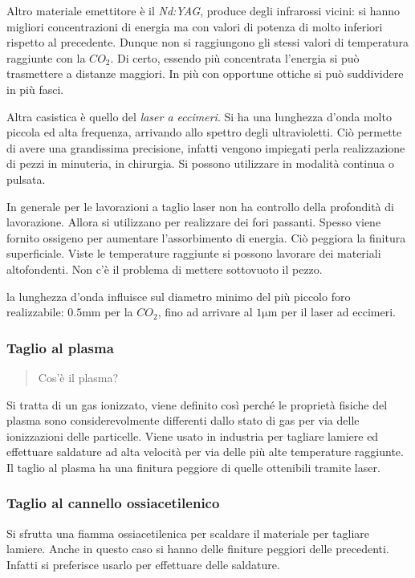 Altro materiale emettitore è il \emph{Nd:YAG}, produce degli infrarossi vicini: si hanno migliori concentrazioni di energia ma con valori di potenza di molto inferiori rispetto al precedente. Dunque non si raggiungono gli stessi valori di temperatura raggiunte con la $CO_2$.
Di certo, essendo più concentrata l'energia si può trasmettere a distanze maggiori. In più con opportune ottiche si può suddividere in più fasci.

Altra casistica è quello del \emph{laser a eccimeri}. Si ha una lunghezza d'onda molto piccola ed alta frequenza, arrivando allo spettro degli ultravioletti. 
Ciò permette di avere una grandissima precisione, infatti vengono impiegati perla realizzazione di pezzi in minuteria, in chirurgia.
Si possono utilizzare in modalità continua o pulsata.

In generale per le lavorazioni a taglio laser non ha controllo della profondità di lavorazione. Allora si utilizzano per realizzare dei fori passanti.
Spesso viene fornito ossigeno per aumentare l'assorbimento di energia.
Ciò peggiora la finitura superficiale. 
Viste le temperature raggiunte si possono lavorare dei materiali altofondenti. Non c'è il problema di mettere sottovuoto il pezzo.

la lunghezza d'onda influisce sul diametro minimo del più piccolo foro realizzabile:
$0.5\unit{\mm}$ per la $CO_2$, fino ad arrivare al $1\unit{\um}$ per il laser ad eccimeri.

\subsubsection{Taglio al plasma}
\begin{quote}
Cos'è il plasma?
\end{quote}
Si tratta di un gas ionizzato, viene definito così perché le proprietà fisiche del plasma sono considerevolmente differenti dallo stato di gas per via delle ionizzazioni delle particelle.
Viene usato in industria per tagliare lamiere ed effettuare saldature ad alta velocità per via delle più alte temperature raggiunte.
Il taglio al plasma ha una finitura peggiore di quelle ottenibili tramite laser.

\subsubsection{Taglio al cannello ossiacetilenico}
Si sfrutta una fiamma ossiacetilenica per scaldare il materiale per tagliare lamiere. Anche in questo caso si hanno delle finiture peggiori delle precedenti. Infatti si preferisce usarlo per effettuare delle saldature.

